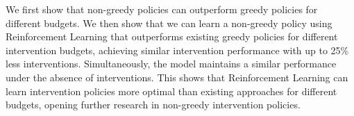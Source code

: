 We first show that non-greedy policies can outperform 
greedy policies for different budgets.
We then show that we can learn a non-greedy policy using Reinforcement Learning that outperforms
existing greedy policies for different intervention budgets, achieving 
similar intervention performance with up to 25\% less interventions.
Simultaneously, the model maintains a similar 
performance under the absence of interventions.
This shows that Reinforcement Learning can
 learn intervention policies more optimal than
existing approaches for different budgets, 
opening further research in non-greedy intervention policies.



